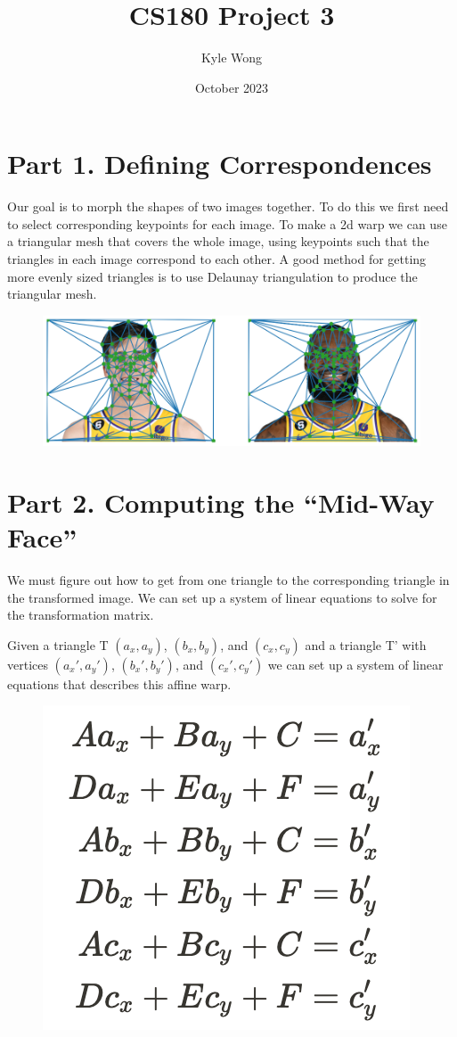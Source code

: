 \documentclass{article}
\title{CS180 Project 3}
\author{Kyle Wong}
\date{October 2023}
\begin{document}
\maketitle

\section{Part 1. Defining Correspondences}
Our goal is to morph the shapes of two images together. 
To do this we first need to select corresponding keypoints for each image. To make a 2d warp we can use a triangular mesh that covers the whole image, using keypoints such that the triangles in each image correspond to each other. A good method for getting more evenly sized triangles is to use Delaunay triangulation to produce the triangular mesh.

\begin{figure}[!htb]
    \centering
    \includegraphics[scale=0.5]{im1.png}
\end{figure}

\section{Part 2. Computing the “Mid-Way Face”}
We must figure out how to get from one triangle to the corresponding triangle in the transformed image. We can set up a system of linear equations to solve for the transformation matrix.

Given a triangle T $(a_x, a_y)$, $(b_x, b_y)$, and $(c_x, c_y)$ and a triangle T' with vertices $(a_x', a_y')$, $(b_x', b_y')$, and $(c_x', c_y')$ we can set up a system of linear equations that describes this affine warp.

\begin{figure}[!htb]
    \centering
    \includegraphics[scale=0.5]{im2.png}
\end{figure}
\end{document}

